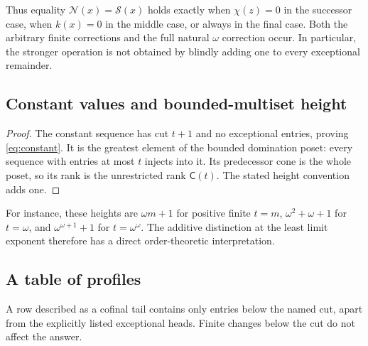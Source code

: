\documentclass[11pt,a4paper]{article}
\newtheorem{corollary}[theorem]{Corollary}
\theoremstyle{definition}
\newcommand{\rk}{\operatorname{rk}}
\newcommand{\ns}{\mathbin{\#}}
\newcommand{\nprod}{\mathbin{\otimes}}
\newcommand{\OpN}{\mathcal N}
\newcommand{\OpS}{\mathcal S}
\newcommand{\FunC}{\mathsf C}
\begin{document}
Thus equality $\OpN(x)=\OpS(x)$ holds exactly when $\chi(z)=0$ in the
successor case, when $k(x)=0$ in the middle case, or always in the final case.
Both the arbitrary finite corrections and the full natural $\omega$
correction occur. In particular, the stronger operation is not obtained by
blindly adding one to every exceptional remainder.

\subsection{Constant values and bounded-multiset height}
\begin{proof}
The constant sequence has cut $t+1$ and no exceptional entries, proving
\eqref{eq:constant}. It is the greatest element of the bounded domination
poset: every sequence with entries at most $t$ injects into it. Its
predecessor cone is the whole poset, so its rank is the unrestricted rank
$\FunC(t)$. The stated height convention adds one.
\end{proof}

For instance, these heights are $\omega m+1$ for positive finite $t=m$,
$\omega^2+\omega+1$ for $t=\omega$, and $\omega^{\omega+1}+1$ for
$t=\omega^\omega$. The additive distinction at the least limit exponent
therefore has a direct order-theoretic interpretation.

\subsection{A table of profiles}
A row described as a cofinal tail contains only entries below the named cut,
apart from the explicitly listed exceptional heads. Finite changes below
the cut do not affect the answer.
\end{document}
